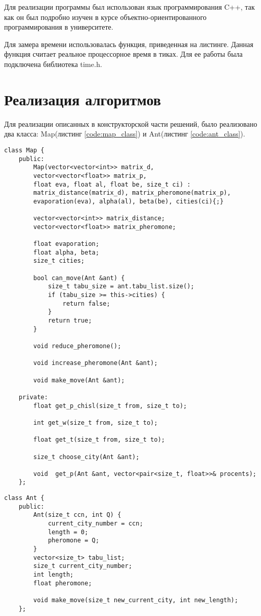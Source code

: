 \documentclass[12pt, a4paper]{report}
\begin{document}
    Для реализации программы был использован язык программирования C++, так как он был подробно изучен в курсе объектно-ориентированного программирования в университете\cite{C}.
    
    Для замера времени использовалась функция, приведенная на листинге\cite{time_b}. Данная функция считает реальное процессорное время в тиках. Для ее работы была подключена библиотека time.h.
   
    \section{Реализация алгоритмов}
    
    Для реализации описанных в конструкторской части решений, было реализовано два класса: Map(листинг \ref{code:map_class}) и Ant(листинг  \ref{code:ant_class}).
    \begin{lstlisting}[label=code:map_class,caption=Класс Map]
    class Map {
    public:
	    Map(vector<vector<int>> matrix_d,
	    vector<vector<float>> matrix_p,
	    float eva, float al, float be, size_t ci) :
	    matrix_distance(matrix_d), matrix_pheromone(matrix_p),
	    evaporation(eva), alpha(al), beta(be), cities(ci){;}
	
	    vector<vector<int>> matrix_distance;
	    vector<vector<float>> matrix_pheromone;
	    
	    float evaporation;
	    float alpha, beta;
	    size_t cities;
	    
	    bool can_move(Ant &ant) {
		    size_t tabu_size = ant.tabu_list.size();
		    if (tabu_size >= this->cities) {
			    return false;
			}
			return true;
	    }
	    
	    void reduce_pheromone();
	    
	    void increase_pheromone(Ant &ant);
	    
	    void make_move(Ant &ant);
    
    private:
	    float get_p_chisl(size_t from, size_t to);
	    
	    int get_w(size_t from, size_t to);
	    
	    float get_t(size_t from, size_t to);
	    
	    size_t choose_city(Ant &ant);
	    
	    void  get_p(Ant &ant, vector<pair<size_t, float>>& procents);
    };
    \end{lstlisting}
    
    \begin{lstlisting}[label=code:ant_class,caption=Класс Ant]
    class Ant {
    public:
	    Ant(size_t ccn, int Q) {
		    current_city_number = ccn;
		    length = 0;
		    pheromone = Q;
	    }
	    vector<size_t> tabu_list;
	    size_t current_city_number;
	    int length;
	    float pheromone;
	    
	    void make_move(size_t new_current_city, int new_length);
    };
    \end{lstlisting}
    
\end{document}
